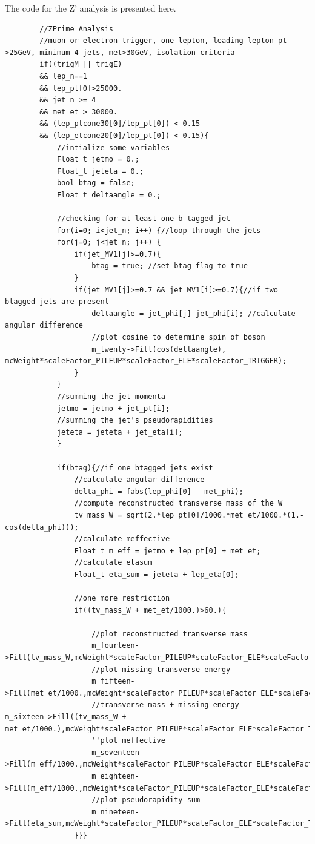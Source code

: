 \documentclass[runningheads,a4paper]{llncs}
\begin{document}
\fontsize{7}{5}\selectfont
The code for the Z' analysis is presented here.
\begin{verbatim}
		//ZPrime Analysis
		//muon or electron trigger, one lepton, leading lepton pt >25GeV, minimum 4 jets, met>30GeV, isolation criteria
		if((trigM || trigE) 
        && lep_n==1 
        && lep_pt[0]>25000. 
        && jet_n >= 4 
        && met_et > 30000. 
        && (lep_ptcone30[0]/lep_pt[0]) < 0.15 
        && (lep_etcone20[0]/lep_pt[0]) < 0.15){
			//intialize some variables
			Float_t jetmo = 0.;
			Float_t jeteta = 0.;
			bool btag = false;
			Float_t deltaangle = 0.;

			//checking for at least one b-tagged jet
			for(i=0; i<jet_n; i++) {//loop through the jets
			for(j=0; j<jet_n; j++) {
				if(jet_MV1[j]>=0.7){
					btag = true; //set btag flag to true
				}
				if(jet_MV1[j]>=0.7 && jet_MV1[i]>=0.7){//if two btagged jets are present
					deltaangle = jet_phi[j]-jet_phi[i]; //calculate angular difference
					//plot cosine to determine spin of boson
					m_twenty->Fill(cos(deltaangle), mcWeight*scaleFactor_PILEUP*scaleFactor_ELE*scaleFactor_TRIGGER);
				}
			}
			//summing the jet momenta
			jetmo = jetmo + jet_pt[i];
			//summing the jet's pseudorapidities
			jeteta = jeteta + jet_eta[i];
			}

			if(btag){//if one btagged jets exist
				//calculate angular difference
				delta_phi = fabs(lep_phi[0] - met_phi); 
				//compute reconstructed transverse mass of the W
				tv_mass_W = sqrt(2.*lep_pt[0]/1000.*met_et/1000.*(1.-cos(delta_phi)));
				//calculate meffective
				Float_t m_eff = jetmo + lep_pt[0] + met_et;
				//calculate etasum
				Float_t eta_sum = jeteta + lep_eta[0];

				//one more restriction
				if((tv_mass_W + met_et/1000.)>60.){
					
					//plot reconstructed transverse mass		
					m_fourteen->Fill(tv_mass_W,mcWeight*scaleFactor_PILEUP*scaleFactor_ELE*scaleFactor_TRIGGER);	
					//plot missing transverse energy
					m_fifteen->Fill(met_et/1000.,mcWeight*scaleFactor_PILEUP*scaleFactor_ELE*scaleFactor_TRIGGER);	
					//transverse mass + missing energy
m_sixteen->Fill((tv_mass_W + met_et/1000.),mcWeight*scaleFactor_PILEUP*scaleFactor_ELE*scaleFactor_TRIGGER);
					''plot meffective
					m_seventeen->Fill(m_eff/1000.,mcWeight*scaleFactor_PILEUP*scaleFactor_ELE*scaleFactor_TRIGGER);
					m_eighteen->Fill(m_eff/1000.,mcWeight*scaleFactor_PILEUP*scaleFactor_ELE*scaleFactor_TRIGGER);	
					//plot pseudorapidity sum
					m_nineteen->Fill(eta_sum,mcWeight*scaleFactor_PILEUP*scaleFactor_ELE*scaleFactor_TRIGGER);			
				}}}
\end{verbatim}
\pagebreak
\end{document}
